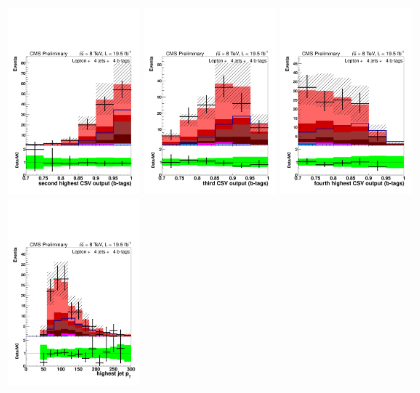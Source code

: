 \begin{figure}[hbtp]
\begin{center}
   \includegraphics[width=0.31\textwidth]{Figures/Analysis_2_Diagrams/LJ_plots_lep/4j4t/lep_jet_csv_2_4j4t_cumulative_wRatio_noLegend_lin.pdf}
   \includegraphics[width=0.31\textwidth]{Figures/Analysis_2_Diagrams/LJ_plots_lep/4j4t/lep_jet_csv_3_4j4t_cumulative_wRatio_noLegend_lin.pdf}
   \includegraphics[width=0.31\textwidth]{Figures/Analysis_2_Diagrams/LJ_plots_lep/4j4t/lep_jet_csv_4_4j4t_cumulative_wRatio_noLegend_lin.pdf}
   \includegraphics[width=0.31\textwidth]{Figures/Analysis_2_Diagrams/LJ_plots_lep/4j4t/lep_jet_pt_1_4j4t_cumulative_wRatio_noLegend_lin.pdf}

\end{center}
\end{figure}

